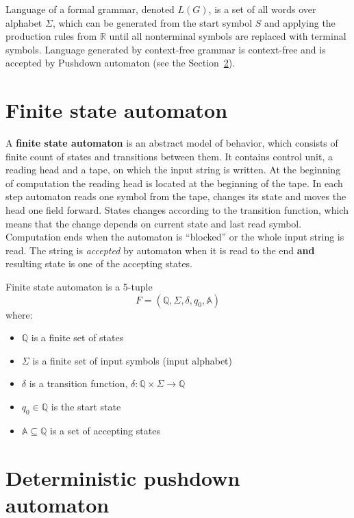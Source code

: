 \documentclass[12pt,notitlepage]{report}
\begin{document}
Language of a formal grammar, denoted $L(G)$, is a set of all words over alphabet $\Sigma$, which can be generated from the start symbol $S$ and applying the production rules from $\mathbb{R}$ until all nonterminal symbols are replaced with terminal symbols. Language generated by context-free grammar is context-free and is accepted by Pushdown automaton (see the Section~\ref{dpda}).

\section{Finite state automaton}
A \textbf{finite state automaton} is an abstract model of behavior, which consists of finite count of states and transitions between them. It contains control unit, a reading head and a tape, on which the input string is written. At the beginning of computation the reading head is located at the beginning of the tape. In each step automaton reads one symbol from the tape, changes its state and moves the head one field forward. States changes according to the transition function, which means that the change depends on current state and last read symbol. Computation ends when the automaton is ``blocked'' or the whole input string is read. The string is \textit{accepted} by automaton when it is read to the end \textbf{and} resulting state is one of the accepting states.

\begin{definition}
Finite state automaton is a 5-tuple \[F = (\mathbb{Q}, \Sigma, \delta, q_{0}, \mathbb{A})\] where:

\begin{itemize}
 \item $\mathbb{Q}$ is a finite set of states
 \item $\Sigma$ is a finite set of input symbols (input alphabet)
 \item $\delta$ is a transition function, $\delta: \mathbb{Q} \times \Sigma \rightarrow \mathbb{Q}$
 \item $q_{0} \in \mathbb{Q}$ is the start state
 \item $\mathbb{A} \subseteq \mathbb{Q}$ is a set of accepting states
\end{itemize}
\end{definition}

\section{Deterministic pushdown automaton}
\label{dpda}
\end{document}
